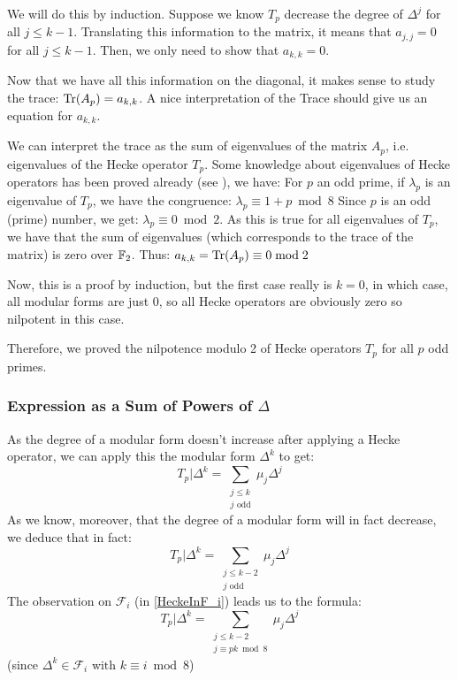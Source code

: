 We will do this by induction.
Suppose we know $T_p$ decrease the degree of $\Delta^j$ for all $j \leq k-1$.
Translating this information to the matrix, it means that $a_{j,j}=0$ for all $j \leq k-1$.
Then, we only need to show that $a_{k,k}=0$.

Now that we have all this information on the diagonal, it makes sense to study the trace: 
$\text{Tr}(A_p) = a_{k,k}$.
A nice interpretation of the Trace should give us an equation for $a_{k,k}$.

We can interpret the trace as the sum of eigenvalues of the matrix $A_p$, i.e. eigenvalues of the Hecke operator $T_p$.
Some knowledge about eigenvalues of Hecke operators has been proved already (see \cite{EigenvaluesOfHeckeOperators}), we have:
For $p$ an odd prime, if $\lambda_p$ is an eigenvalue of $T_p$, we have the congruence: $\lambda_p \equiv 1+p \bmod 8$
Since $p$ is an odd (prime) number, we get: $\lambda_p \equiv 0 \bmod 2$.
As this is true for all eigenvalues of $T_p$, we have that the sum of eigenvalues (which corresponds to the trace of the matrix) is zero over $\mathbb{F}_2$.
Thus: 
$a_{k,k} = \text{Tr}(A_p) \equiv 0 \bmod 2$

Now, this is a proof by induction, but the first case really is $k=0$, in which case, all modular forms are just $0$, so all Hecke operators are obviously zero so nilpotent in this case.

Therefore, we proved the nilpotence modulo 2 of Hecke operators $T_p$ for all $p$ odd primes.

\subsubsection[Expression for $T_p|\Delta^k$]{Expression as a Sum of Powers of $\Delta$}
As the degree of a modular form doesn't increase after applying a Hecke operator, we can apply this the modular form $\Delta^k$ to get:
$$
T_p|\Delta^k = \sum_{\substack{j \leq k \\ j \text{ odd}}} \mu_j\Delta^j
$$
As we know, moreover, that the degree of a modular form will in fact decrease, we deduce that in fact:
\[
T_p|\Delta^k = \sum_{\substack{j \leq k-2\\ j \text{ odd}}} \mu_j\Delta^j
\label{eq:TpDelta^k} \tag{*}
\]
The observation on $\mathcal{F}_i$ (in \ref{HeckeInF_i}) leads us to the formula:
\[
T_p|\Delta^k = \sum_{\substack{j \leq k-2\\ j \equiv pk \bmod 8}} \mu_j\Delta^j
\label{eq:TpDelta^k_bis} \tag{**}
\]
(since $\Delta^k \in \mathcal{F}_i \text{ with } k \equiv i \bmod 8$)

